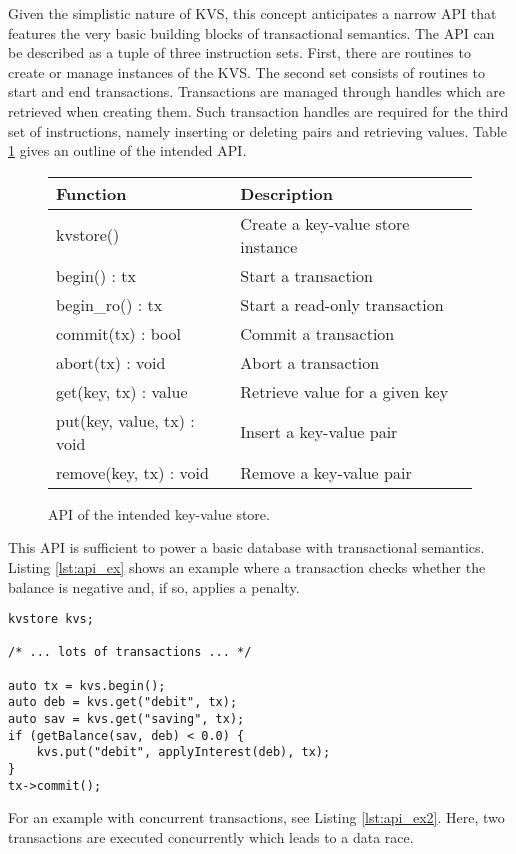 Given the simplistic nature of KVS, this concept anticipates a narrow API that
features the very basic building blocks of transactional semantics. The API can
be described as a tuple of three instruction sets. First, there are routines to
create or manage instances of the KVS. The second set consists of routines to
start and end transactions. Transactions are managed through handles which are
retrieved when creating them. Such transaction handles are required for the
third set of instructions, namely inserting or deleting pairs and retrieving
values. Table \ref{tab:api} gives an outline of the intended API.

\begin{figure}[!h]
    \centering
    \begin{tabular}{|l|l|}
        \hline
        \textbf{Function}          & \textbf{Description} \\
        \hline
        kvstore()                  & Create a key-value store instance \\
        begin() : tx               & Start a transaction \\
        begin\_ro() : tx            & Start a read-only transaction \\
        commit(tx) : bool          & Commit a transaction \\
        abort(tx) : void           & Abort a transaction \\
        get(key, tx) : value       & Retrieve value for a given key \\
        put(key, value, tx) : void & Insert a key-value pair \\
        remove(key, tx) : void     & Remove a key-value pair \\
        \hline
    \end{tabular}
    \caption{API of the intended key-value store.}
    \label{tab:api}
\end{figure}

This API is sufficient to power a basic database with transactional semantics.
Listing \ref{lst:api_ex} shows an example where a transaction checks whether the
balance is negative and, if so, applies a penalty.

\begin{lstlisting}
kvstore kvs;

/* ... lots of transactions ... */

auto tx = kvs.begin();
auto deb = kvs.get("debit", tx);
auto sav = kvs.get("saving", tx);
if (getBalance(sav, deb) < 0.0) {
	kvs.put("debit", applyInterest(deb), tx);
}
tx->commit();
\end{lstlisting}\label{lst:api_ex}

For an example with concurrent transactions, see Listing \ref{lst:api_ex2}.
Here, two transactions are executed concurrently which leads to a data race.

